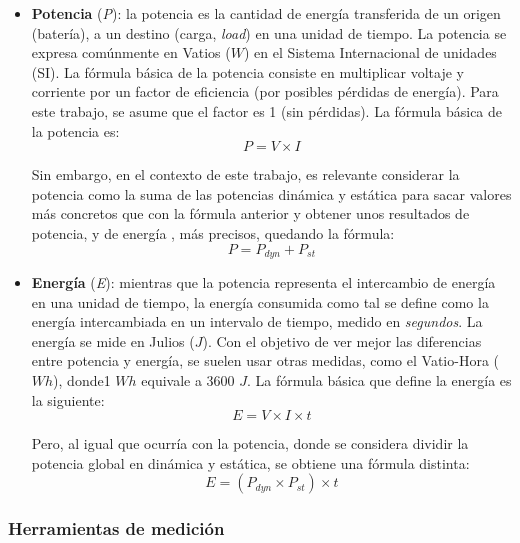 \begin{itemize}
    \item \textbf{Potencia} (\emph{P}): la potencia es la cantidad de energía transferida de un origen (batería), a un destino (carga, \textit{load}) en una unidad de tiempo. La potencia se expresa comúnmente en Vatios ($W$) en el Sistema Internacional de unidades (SI). La fórmula básica de la potencia consiste en multiplicar voltaje y corriente por un factor de eficiencia (por posibles pérdidas de energía). Para este trabajo, se asume que el factor es 1 (sin pérdidas). La fórmula básica de la potencia es: \begin{equation}\label{eq:potencia2}P = V \times I\end{equation}

    \vspace*{-0.3cm}
    Sin embargo, en el contexto de este trabajo, es relevante considerar la potencia como la suma de las potencias dinámica y estática \cite{soledadPotencia} para sacar valores más concretos que con la fórmula anterior y obtener unos resultados de potencia, y de energía , más precisos, quedando la fórmula: 
    \begin{equation}\label{eq:potencia}P = P_{dyn} + P_{st}\end{equation}

    \item \textbf{Energía} (\emph{E}): mientras que la potencia representa el intercambio de energía en una unidad de tiempo, la energía consumida como tal se define como la energía intercambiada en un intervalo de tiempo, medido en \emph{segundos}. La energía se mide en Julios ($J$). Con el objetivo de ver mejor las diferencias entre potencia y energía, se suelen usar otras medidas, como el Vatio-Hora ($Wh$), donde1 $Wh$ equivale a 3600 $J$. La fórmula básica que define la energía es la siguiente: \begin{equation}\label{eq:energia2}E = V \times I \times t\end{equation}
    
    \vspace*{-0.3cm}
    Pero, al igual que ocurría con la potencia, donde se considera dividir la potencia global en dinámica y estática, se obtiene una fórmula distinta:
    \begin{equation}\label{eq:energia}E = (P_{dyn} \times P_{st}) \times t\end{equation}
    
\end{itemize}

\subsubsection{Herramientas de medición}

